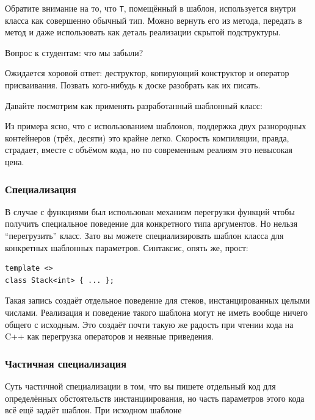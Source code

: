 \documentclass[a4paper,12pt,oneside]{article}
\begin{document}


Обратите внимание на то, что \lstinline!T!, помещённый в шаблон, используется внутри класса как совершенно обычный тип. Можно вернуть его из метода, передать в метод и даже использовать как деталь реализации скрытой подструктуры.



Вопрос к студентам: что мы забыли?

Ожидается хоровой ответ: деструктор, копирующий конструктор и оператор присваивания. Позвать кого-нибудь к доске разобрать как их писать.

Давайте посмотрим как применять разработанный шаблонный класс:



Из примера ясно, что с использованием шаблонов, поддержка двух разнородных контейнеров (трёх, десяти) это крайне легко. Скорость компиляции, правда, страдает, вместе с объёмом кода, но по современным реалиям это невысокая цена.

\subsubsection{Специализация}

В случае с функциями был использован механизм перегрузки функций чтобы получить специальное поведение для конкретного типа аргументов. Но нельзя ``перегрузить'' класс. Зато вы можете специализировать шаблон класса для конкретных шаблонных параметров. Синтаксис, опять же, прост:

\begin{lstlisting}
template <>
class Stack<int> { ... };
\end{lstlisting}

Такая запись создаёт отдельное поведение для стеков, инстанцированных целыми числами. Реализация и поведение такого шаблона могут не иметь вообще ничего общего с исходным. Это создаёт почти такую же радость при чтении кода на C++ как перегрузка операторов и неявные приведения.

\subsubsection{Частичная специализация}

Суть частичной специализации в том, что вы пишете отдельный код для определённых обстоятельств инстанциирования, но часть параметров этого кода всё ещё задаёт шаблон. При исходном шаблоне
\end{document}

